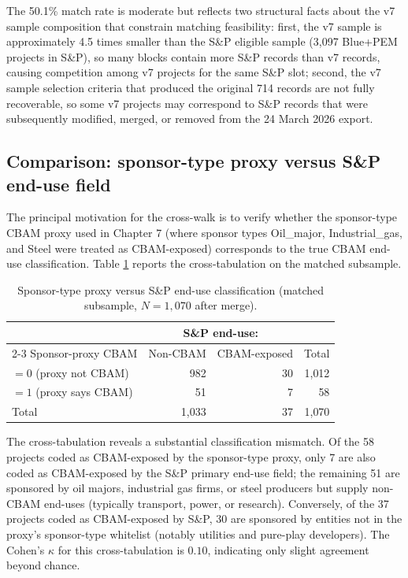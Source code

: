 \documentclass[11pt,a4paper]{article}
\begin{document}
The 50.1\% match rate is moderate but reflects two structural facts about the v7 sample composition that constrain matching feasibility: first, the v7 sample is approximately 4.5 times smaller than the S\&P eligible sample (3{,}097 Blue+PEM projects in S\&P), so many blocks contain more S\&P records than v7 records, causing competition among v7 projects for the same S\&P slot; second, the v7 sample selection criteria that produced the original 714 records are not fully recoverable, so some v7 projects may correspond to S\&P records that were subsequently modified, merged, or removed from the 24 March 2026 export.

\subsection{Comparison: sponsor-type proxy versus S\&P end-use field}

The principal motivation for the cross-walk is to verify whether the sponsor-type CBAM proxy used in Chapter 7 (where sponsor types Oil\_major, Industrial\_gas, and Steel were treated as CBAM-exposed) corresponds to the true CBAM end-use classification. Table \ref{tab:app-proxy-comparison} reports the cross-tabulation on the matched subsample.

\begin{table}[ht]
\centering
\caption{Sponsor-type proxy versus S\&P end-use classification (matched subsample, $N = 1{,}070$ after merge).}
\label{tab:app-proxy-comparison}
\begin{tabular}{lrrr}
\toprule
& \multicolumn{2}{c}{S\&P end-use:} & \\
\cmidrule(lr){2-3}
Sponsor-proxy CBAM & Non-CBAM & CBAM-exposed & Total \\
\midrule
$=0$ (proxy not CBAM) & 982 & 30 & 1{,}012 \\
$=1$ (proxy says CBAM) & 51  & 7  & 58 \\
\midrule
Total & 1{,}033 & 37 & 1{,}070 \\
\bottomrule
\end{tabular}
\end{table}

The cross-tabulation reveals a substantial classification mismatch. Of the 58 projects coded as CBAM-exposed by the sponsor-type proxy, only 7 are also coded as CBAM-exposed by the S\&P primary end-use field; the remaining 51 are sponsored by oil majors, industrial gas firms, or steel producers but supply non-CBAM end-uses (typically transport, power, or research). Conversely, of the 37 projects coded as CBAM-exposed by S\&P, 30 are sponsored by entities not in the proxy's sponsor-type whitelist (notably utilities and pure-play developers). The Cohen's $\kappa$ for this cross-tabulation is $0.10$, indicating only slight agreement beyond chance.
\end{document}
